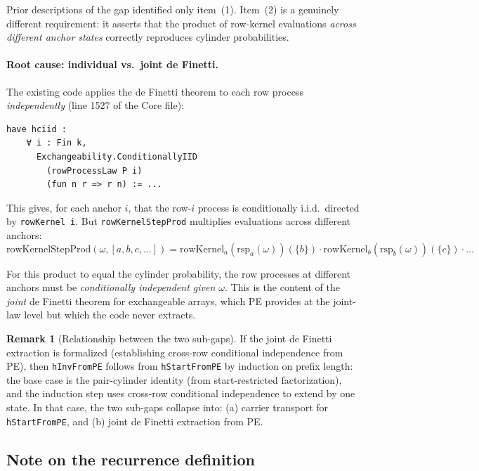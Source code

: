 \documentclass[11pt]{article}
\theoremstyle{definition}
\newtheorem{remark}[theorem]{Remark}
\newcommand{\lean}[1]{\texttt{#1}}
\begin{document}
\noindent Prior descriptions of the gap identified only item~(1).
Item~(2) is a genuinely different requirement: it asserts that the
product of row-kernel evaluations \emph{across different anchor states}
correctly reproduces cylinder probabilities.

\paragraph{Root cause: individual vs.\ joint de Finetti.}
The existing code applies the de Finetti theorem to each row process
\emph{independently} (line 1527 of the Core file):
\begin{lstlisting}
have hciid :
    ∀ i : Fin k,
      Exchangeability.ConditionallyIID
        (rowProcessLaw P i)
        (fun n r => r n) := ...
\end{lstlisting}

This gives, for each anchor $i$, that the row-$i$ process is
conditionally i.i.d.\ directed by \lean{rowKernel i}.  But
\lean{rowKernelStepProd} multiplies evaluations across different
anchors:
\[
\mathrm{rowKernelStepProd}(\omega, [a,b,c,\ldots])
= \mathrm{rowKernel}_a(\mathrm{rsp}_a(\omega))(\{b\}) \cdot
  \mathrm{rowKernel}_b(\mathrm{rsp}_b(\omega))(\{c\}) \cdot \ldots
\]

For this product to equal the cylinder probability, the row processes
at different anchors must be \emph{conditionally independent given
$\omega$}.  This is the content of the \emph{joint} de Finetti theorem
for exchangeable arrays, which PE provides at the joint-law level but
which the code never extracts.

\begin{remark}[Relationship between the two sub-gaps]
If the joint de Finetti extraction is formalized (establishing cross-row
conditional independence from PE), then \lean{hInvFromPE} follows from
\lean{hStartFromPE} by induction on prefix length: the base case is
the pair-cylinder identity (from start-restricted factorization), and
the induction step uses cross-row conditional independence to
extend by one state.  In that case, the two sub-gaps collapse into:
(a) carrier transport for \lean{hStartFromPE}, and
(b) joint de Finetti extraction from PE.
\end{remark}

\subsection{Note on the recurrence definition}
\end{document}
